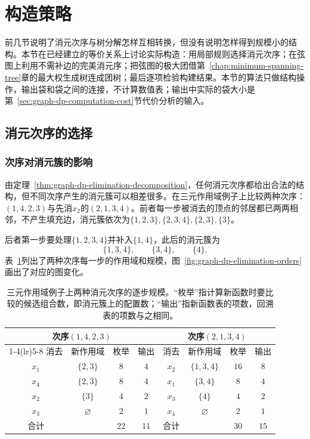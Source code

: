 
\section{构造策略}
\label{sec:graph-tree-decomposition-construction}

前几节说明了消元次序与树分解怎样互相转换，但没有说明怎样得到规模小的结构。本节在已经建立的等价关系上讨论实际构造：用局部规则选择消元次序；在弦图上利用不需补边的完美消元序；把弦图的极大团借第~\ref{chap:minimum-spanning-tree}章的最大权生成树连成团树；最后逐项检验构建结果。本节的算法只做结构操作，输出袋和袋之间的连接，不计算数值表；输出中实际的袋大小是第~\ref{sec:graph-dp-computation-cost}节代价分析的输入。

\subsection{消元次序的选择}
\label{sec:graph-dp-order-heuristics}
\label{sec:graph-dp-elimination-orders}

\subsubsection{次序对消元簇的影响}

由定理~\ref{thm:graph-dp-elimination-decomposition}，任何消元次序都给出合法的结构，但不同次序产生的消元簇可以相差很多。在三元作用域例子上比较两种次序：$(1,4,2,3)$与先消$x_2$的$(2,1,3,4)$。前者每一步被消去的顶点的邻居都已两两相邻，不产生填充边，消元簇依次为$\{1,2,3\},\{2,3,4\},\{2,3\},\{3\}$。

后者第一步要处理$\{1,2,3,4\}$并补入$\{1,4\}$，此后的消元簇为
\[
 \{1,3,4\},\qquad \{3,4\},\qquad \{4\}.
\]
表~\ref{tab:graph-dp-elimination-orders}列出了两种次序每一步的作用域和规模，图~\ref{fig:graph-dp-elimination-orders}画出了对应的图变化。

\begin{table}[!htb]
  \centering
  \begin{tabular}{cccccccc}
    \toprule
    \multicolumn{4}{c}{次序$(1,4,2,3)$} & \multicolumn{4}{c}{次序$(2,1,3,4)$}\\
    \cmidrule(lr){1-4}\cmidrule(lr){5-8}
    消去 & 新作用域 & 枚举 & 输出 & 消去 & 新作用域 & 枚举 & 输出\\
    \midrule
    $x_1$ & $\{2,3\}$ & $8$ & $4$ & $x_2$ & $\{1,3,4\}$ & $16$ & $8$\\
    $x_4$ & $\{2,3\}$ & $8$ & $4$ & $x_1$ & $\{3,4\}$ & $8$ & $4$\\
    $x_2$ & $\{3\}$ & $4$ & $2$ & $x_3$ & $\{4\}$ & $4$ & $2$\\
    $x_3$ & $\varnothing$ & $2$ & $1$ & $x_4$ & $\varnothing$ & $2$ & $1$\\
    \midrule
    合计 & & $22$ & $11$ & 合计 & & $30$ & $15$\\
    \bottomrule
  \end{tabular}
  \caption{三元作用域例子上两种消元次序的逐步规模。“枚举”指计算新函数时要比较的候选组合数，即消元簇上的配置数；“输出”指新函数表的项数，回溯表的项数与之相同。}
  \label{tab:graph-dp-elimination-orders}
\end{table}

